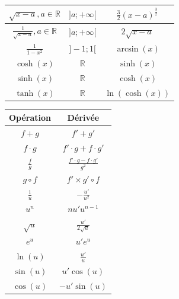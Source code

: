 \documentclass[8pt]{article}
\begin{document}
\begin{center}
\begin{tabular}{|c|c|c|}
                            \hline
                            $ \sqrt{x-a}, a \in \mathbb{R}$ & $ ]a;+\infty[ $ & $ \frac{3}{2}(x-a)^{\frac{3}{2}}$\\
                            \hline
                            $ \frac{1}{\sqrt{x-a}}, a \in \mathbb{R}$ & $ ]a;+\infty[ $ & $ 2\sqrt{x-a}$\\
                            \hline
                            $ \frac{1}{1-x^2}$ & $ ]-1;1[$ & $ \arcsin(x)$\\
                            \hline
                            $ \cosh(x)$ & $ \mathbb{R}$ & $ \sinh(x)$\\
                            \hline 
                            $ \sinh(x)$ & $ \mathbb{R}$ & $ \cosh(x)$\\
                            \hline
                            $ \tanh(x)$ & $ \mathbb{R} $ & $ \ln(\cosh(x))$\\
                            \hline 
                        \end{tabular}
                    \end{center}
                    \begin{center}
                        \renewcommand{\arraystretch}{1.5}
                        \begin{tabular}{|c|c|}
                            \hline
                            \textbf{Opération} & \textbf{Dérivée} \\
                            \hline 
                            \hline
                            $f+g$ & $f'+g'$\\
                            \hline
                            $f \cdot g$ & $f' \cdot g + f \cdot g'$\\
                            \hline
                            $\frac{f}{g} $ & $\frac{f' \cdot g - f \cdot g'}{g^2}$\\
                            \hline
                            $g \circ f$ & $f'\times g' \circ f$\\
                            \hline
                            $\frac{1}{u}$ & $-\frac{u'}{u^2}$\\
                            \hline
                            $u^n$ & $nu'u^{n-1}$\\
                            \hline
                            $\sqrt{u}$ & $\frac{u'}{2\sqrt{u}}$\\
                            \hline
                            $e^{u}$ & $u'e^{u}$\\
                            \hline
                            $\ln(u)$ & $\frac{u'}{u}$\\
                            \hline
                            $\sin(u)$ & $u'\cos(u)$\\
                            \hline
                            $\cos(u)$ & $-u'\sin(u)$\\
                            \hline
                        \end{tabular}
                    \end{center}
\end{document}
